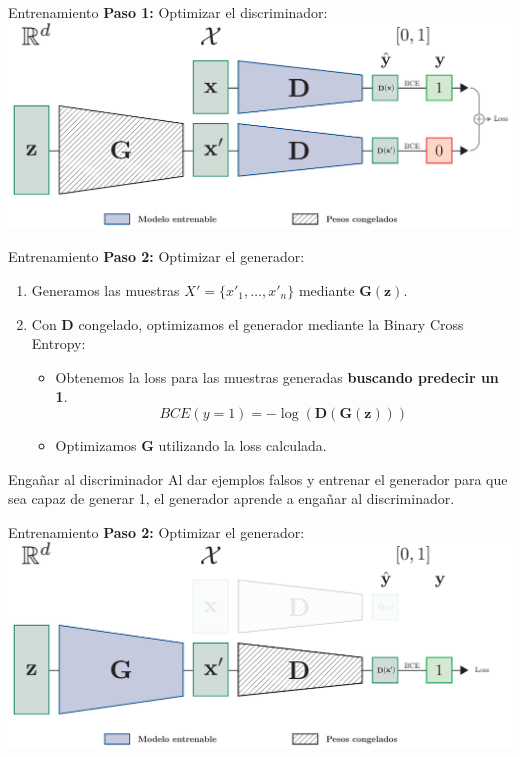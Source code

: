 \documentclass[aspectratio=169]{beamer}
\begin{document}
\begin{frame}[t]{Entrenamiento}
	\textbf{Paso 1:} Optimizar el discriminador:\\
	\vspace{.5cm}
	\includegraphics[width=.9\textwidth, center]{imgs/tema4/gan/train_step1.pdf}\\
\end{frame}

\begin{frame}[t]{Entrenamiento}
	\textbf{Paso 2:} Optimizar el generador:\\
	\begin{enumerate}
		\item Generamos las muestras $X'=\{x'_1,\ldots, x'_n\}$ mediante $\mathbf{G}(\mathbf z)$.
		\item Con $\mathbf{D}$ congelado, optimizamos el generador mediante la Binary Cross Entropy:
		\begin{itemize}
			\item Obtenemos la loss para las muestras generadas \textbf{buscando predecir un 1}. 
			$$BCE(y=1) = -\log(\mathbf{D}(\mathbf{G}(\mathbf z)))$$
			\item Optimizamos $\mathbf{G}$ utilizando la loss calculada.
		\end{itemize}
	\end{enumerate}
	\vspace{.5cm}
	\begin{block}{Engañar al discriminador}
		Al dar ejemplos falsos y entrenar el generador para que sea capaz de generar 1, el generador aprende a engañar al discriminador.
	\end{block}

\end{frame}

\begin{frame}[t]{Entrenamiento}
	\textbf{Paso 2:} Optimizar el generador:\\
	\vspace{.5cm}
	\includegraphics[width=.9\textwidth, center]{imgs/tema4/gan/train_step2.pdf}\\
\end{frame}
\end{document}
